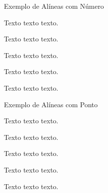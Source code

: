 \begin{quadro}[!h]	
\centering
{}		
\end{quadro}

\newpage

\begin{center}
Exemplo de Alíneas com Número  
\end{center}
\begin{alineascomnumero}
\item Texto texto texto.
\item Texto texto texto.
\item Texto texto texto.
\item Texto texto texto.
\item Texto texto texto.
\end{alineascomnumero}

\begin{center}
Exemplo de Alíneas com Ponto  
\end{center}
\begin{alineascomponto}
\item Texto texto texto.
\item Texto texto texto.
\item Texto texto texto.
\begin{subalineascomponto}
\item Texto texto texto.
\item Texto texto texto.
\end{subalineascomponto}
\end{alineascomponto}